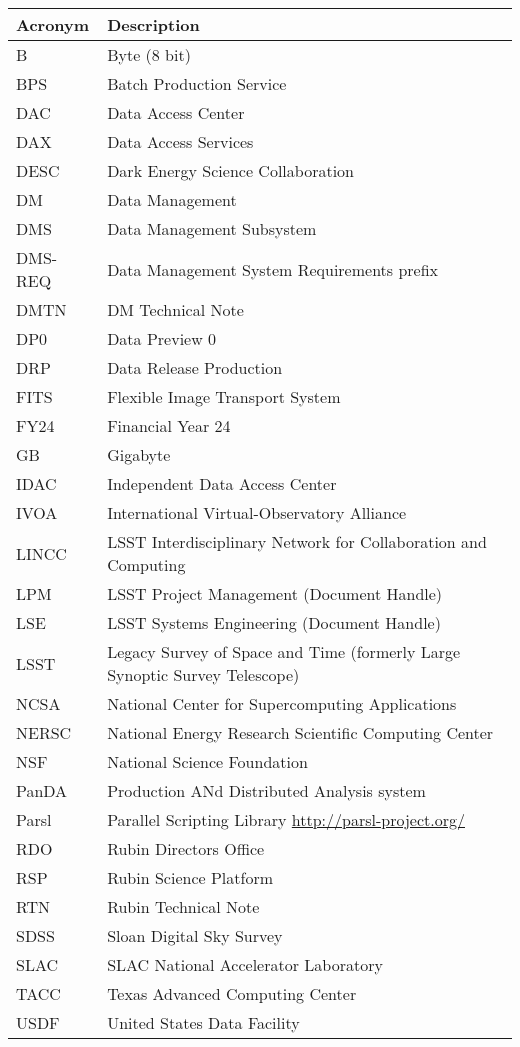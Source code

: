 \addtocounter{table}{-1}
\begin{longtable}{p{}p{}}\hline
\textbf{Acronym} & \textbf{Description}  \\\hline

B & Byte (8 bit) \\\hline
BPS & Batch Production Service \\\hline
DAC & Data Access Center \\\hline
DAX & Data Access Services \\\hline
DESC & Dark Energy Science Collaboration \\\hline
DM & Data Management \\\hline
DMS & Data Management Subsystem \\\hline
DMS-REQ & Data Management System Requirements prefix \\\hline
DMTN & DM Technical Note \\\hline
DP0 & Data Preview 0 \\\hline
DRP & Data Release Production \\\hline
FITS & Flexible Image Transport System \\\hline
FY24 & Financial Year 24 \\\hline
GB & Gigabyte \\\hline
IDAC & Independent Data Access Center \\\hline
IVOA & International Virtual-Observatory Alliance \\\hline
LINCC & LSST Interdisciplinary Network for Collaboration and Computing \\\hline
LPM & LSST Project Management (Document Handle) \\\hline
LSE & LSST Systems Engineering (Document Handle) \\\hline
LSST & Legacy Survey of Space and Time (formerly Large Synoptic Survey Telescope) \\\hline
NCSA & National Center for Supercomputing Applications \\\hline
NERSC & National Energy Research Scientific Computing Center \\\hline
NSF & National Science Foundation \\\hline
PanDA &  Production ANd Distributed Analysis system \\\hline
Parsl & Parallel Scripting Library \url{http://parsl-project.org/} \\\hline
RDO & Rubin Directors Office \\\hline
RSP & Rubin Science Platform \\\hline
RTN & Rubin Technical Note \\\hline
SDSS & Sloan Digital Sky Survey \\\hline
SLAC & SLAC National Accelerator Laboratory \\\hline
TACC & Texas Advanced Computing Center \\\hline
USDF & United States Data Facility \\\hline
\end{longtable}
